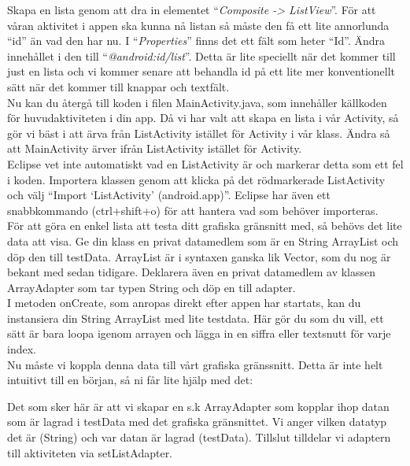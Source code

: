 \documentclass[11 pt, titlepage]{article} %
\begin{document}
Skapa en lista genom att dra in elementet “\textit{Composite -> ListView}”. För att våran aktivitet i appen ska kunna nå listan så måste den få ett lite annorlunda “id” än vad den har nu. I “\textit{Properties}” finns det ett fält som heter “Id”. Ändra innehållet i den till “\textit{@android:id/list}”. Detta är lite speciellt när det kommer till just en lista och vi kommer senare att behandla id på ett lite mer konventionellt sätt när det kommer till knappar och textfält.\\

Nu kan du återgå till koden i filen MainActivity.java, som innehåller källkoden för huvudaktiviteten i din app.
Då vi har valt att skapa en lista i vår Activity, så gör vi bäst i att ärva från ListActivity istället för Activity i vår klass.
Ändra så att MainActivity ärver ifrån ListActivity istället för Activity. \\

Eclipse vet inte automatiskt vad en ListActivity är och markerar detta som ett fel i koden. Importera klassen genom att klicka på det rödmarkerade ListActivity och välj “Import ‘ListActivity’ (android.app)”. Eclipse har även ett snabbkommando (ctrl+shift+o) för att hantera vad som behöver importeras.\\

För att göra en enkel lista att testa ditt grafiska gränsnitt med, så behövs det lite data att visa.
Ge din klass en privat datamedlem som är en String ArrayList och döp den till testData. ArrayList är i syntaxen ganska lik Vector, som du nog är bekant med sedan tidigare.
Deklarera även en privat datamedlem av klassen ArrayAdapter som tar typen String och döp en till adapter.\\


I metoden onCreate, som anropas direkt efter appen har startats, kan du instansiera din String ArrayList med lite testdata. Här gör du som du vill, ett sätt är bara loopa igenom arrayen och lägga in en siffra eller textsnutt för varje index.\\

Nu måste vi koppla denna data till vårt grafiska gränssnitt. Detta är inte helt intuitivt till en början, så ni får lite hjälp med det:

Det som sker här är att vi skapar en s.k ArrayAdapter som kopplar ihop datan som är lagrad i testData med det grafiska gränsnittet. Vi anger vilken datatyp det är (String) och var datan är lagrad (testData). Tillslut tilldelar vi adaptern till aktiviteten via setListAdapter.\\
\end{document}
